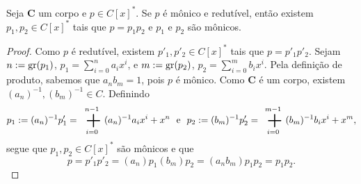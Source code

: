 \begin{proposition}
	Seja $\bm C$ um corpo e $p \in C[x]^*$. Se $p$ é mônico e redutível, então existem $p_1,p_2 \in C[x]^*$ tais que $p=p_1p_2$ e $p_1$ e $p_2$ são mônicos.
\end{proposition}
\begin{proof}
	Como $p$ é redutível, existem $p'_1,p'_2 \in C[x]^*$ tais que $p=p'_1p'_2$. Sejam $n := \operatorname{gr}(p_1)$, $p_1 = \sum_{i=0}^n a_ix^i$, e $m := \operatorname{gr}(p_2)$, $p_2 = \sum_{i=0}^m b_ix^i$. Pela definição de produto, sabemos que $a_nb_m=1$, pois $p$ é mônico. Como $\bm C$ é um corpo, existem $(a_n)^{-1},(b_m)^{-1} \in C$. Definindo
	\begin{equation*}
	p_1 := (a_n)^{-1}p'_1 = \sum_{i=0}^{n-1} (a_n)^{-1}a_ix^i+ x^n \e p_2 := (b_m)^{-1}p'_2 = \sum_{i=0}^{m-1} (b_m)^{-1}b_ix^i + x^m,
	\end{equation*}
segue que $p_1,p_2 \in C[x]^*$ são mônicos e que
	\begin{equation*}
	 p = p'_1p'_2 = (a_n)p_1(b_m)p_2 = (a_nb_m)p_1p_2 = p_1p_2.
	\end{equation*}
\end{proof}

